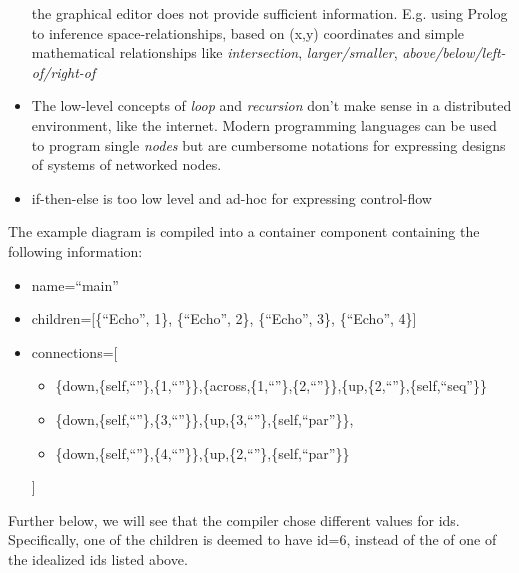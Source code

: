 \begin{itemize}
the graphical editor does not provide sufficient information. E.g. using Prolog to inference
space-relationships, based on (x,y) coordinates and simple mathematical relationships 
like \emph{intersection}, \emph{larger/smaller}, \emph{above/below/left-of/right-of}
\item The low-level concepts of \emph{loop} and \emph{recursion} don't make sense in a distributed environment, like the internet. Modern programming languages can be used to program single \emph{nodes} but are cumbersome notations for expressing designs of systems of networked nodes. 
\item if-then-else is too low level and ad-hoc for expressing control-flow
\end{itemize}


The example diagram is compiled into a container component containing the following information:
\begin{itemize}
\item name=“main”
\item children=[\{“Echo”, 1\}, \{“Echo”, 2\}, \{“Echo”, 3\}, \{“Echo”, 4\}]
\item connections=[
\begin{itemize}
  \item[] \{down,\{self,``''\},\{1,``”\}\},\{across,\{1,``”\},\{2,``”\}\},\{up,\{2,``”\},\{self,``seq''\}\}
  \item[] \{down,\{self,``”\},\{3,``”\}\},\{up,\{3,``”\},\{self,``par”\}\},
  \item[] \{down,\{self,``”\},\{4,``”\}\},\{up,\{2,``”\},\{self,``par”\}\}
\end{itemize}
]
\end{itemize}
Further below, we will see that the compiler chose different values for ids.
Specifically, one of the children is deemed to have id=6, instead of the of one of the idealized ids listed above.
